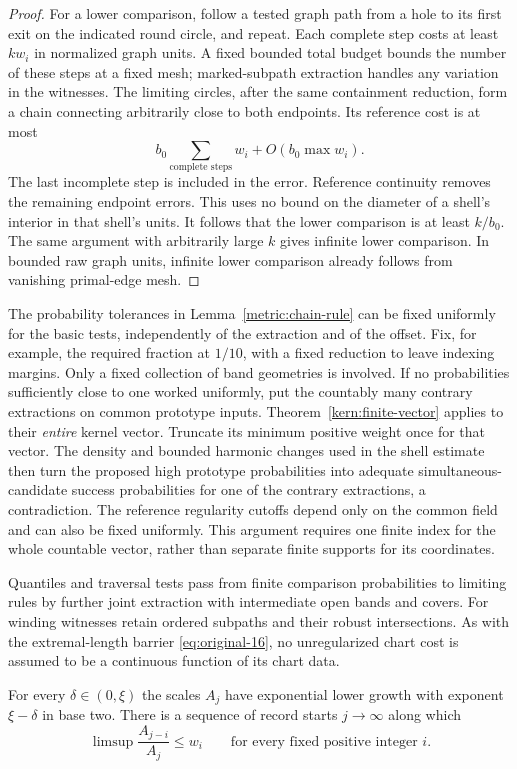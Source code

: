 \begin{proof}
For a lower comparison, follow a tested graph path from a hole to its first
exit on the indicated round circle, and repeat. Each complete step costs at
least $kw_i$ in normalized graph units. A fixed bounded total budget bounds
the number of these steps at a fixed mesh; marked-subpath extraction handles
any variation in the witnesses. The limiting circles, after the same
containment reduction, form a chain connecting arbitrarily close to both
endpoints. Its reference cost is at most
\[
 b_0\sum_{\text{complete steps}}w_i+O(b_0\max w_i).
\]
The last incomplete step is included in the error. Reference continuity
removes the remaining endpoint errors. This uses no bound on the diameter
of a shell's interior in that shell's units. It follows that the lower
comparison is at least $k/b_0$. The same argument with arbitrarily large $k$
gives infinite lower comparison. In bounded raw graph units, infinite lower
comparison already follows from vanishing primal-edge mesh.
\end{proof}

The probability tolerances in Lemma~\ref{metric:chain-rule} can be fixed
uniformly for the basic tests, independently of the extraction and of the
offset. Fix, for example, the required fraction at $1/10$, with a fixed
reduction to leave indexing margins. Only a fixed collection of band
geometries is involved. If no probabilities sufficiently close to one worked
uniformly, put the countably many contrary extractions on common prototype
inputs. Theorem~\ref{kern:finite-vector} applies to their
\emph{entire} kernel vector.
Truncate its minimum positive weight once for that vector. The density and
bounded harmonic changes used in the shell estimate then turn the proposed
high prototype probabilities into adequate simultaneous-candidate success
probabilities for one of the contrary extractions, a contradiction. The
reference regularity cutoffs depend only on the common field and can also
be fixed uniformly. This argument requires one finite index for the whole
countable vector, rather than separate finite supports for its coordinates.

Quantiles and traversal tests pass from finite comparison probabilities to
limiting rules by further joint extraction with intermediate open bands and
covers. For winding witnesses retain ordered subpaths and their robust
intersections. As with the extremal-length barrier
\eqref{eq:original-16}, no unregularized chart cost is assumed to be a
continuous function of its chart data.

\begin{lemma}\label{metric:records}
For every $\delta\in(0,\xi)$ the scales $A_j$ have exponential lower growth
with exponent $\xi-\delta$ in base two. There is a sequence of record starts
$j\to\infty$ along which
\begin{equation}\label{metric:record-ratios}
 \limsup\frac{A_{j-i}}{A_j}\le w_i
 \qquad\text{for every fixed positive integer }i.
\end{equation}
\end{lemma}

